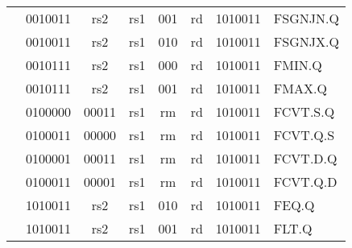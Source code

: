 \begin{table}[p]
\begin{small}
\begin{center}
\begin{tabular}{p{0in}p{0.4in}p{0.05in}p{0.05in}p{0.05in}p{0.05in}p{0.4in}p{0.6in}p{0.4in}p{0.6in}p{0.7in}l}
&
\multicolumn{4}{|c|}{0010011} &
\multicolumn{2}{c|}{rs2} &
\multicolumn{1}{c|}{rs1} &
\multicolumn{1}{c|}{001} &
\multicolumn{1}{c|}{rd} &
\multicolumn{1}{c|}{1010011} & FSGNJN.Q \\
\cline{2-11}
  

&
\multicolumn{4}{|c|}{0010011} &
\multicolumn{2}{c|}{rs2} &
\multicolumn{1}{c|}{rs1} &
\multicolumn{1}{c|}{010} &
\multicolumn{1}{c|}{rd} &
\multicolumn{1}{c|}{1010011} & FSGNJX.Q \\
\cline{2-11}
  

&
\multicolumn{4}{|c|}{0010111} &
\multicolumn{2}{c|}{rs2} &
\multicolumn{1}{c|}{rs1} &
\multicolumn{1}{c|}{000} &
\multicolumn{1}{c|}{rd} &
\multicolumn{1}{c|}{1010011} & FMIN.Q \\
\cline{2-11}
  

&
\multicolumn{4}{|c|}{0010111} &
\multicolumn{2}{c|}{rs2} &
\multicolumn{1}{c|}{rs1} &
\multicolumn{1}{c|}{001} &
\multicolumn{1}{c|}{rd} &
\multicolumn{1}{c|}{1010011} & FMAX.Q \\
\cline{2-11}
  

&
\multicolumn{4}{|c|}{0100000} &
\multicolumn{2}{c|}{00011} &
\multicolumn{1}{c|}{rs1} &
\multicolumn{1}{c|}{rm} &
\multicolumn{1}{c|}{rd} &
\multicolumn{1}{c|}{1010011} & FCVT.S.Q \\
\cline{2-11}
  

&
\multicolumn{4}{|c|}{0100011} &
\multicolumn{2}{c|}{00000} &
\multicolumn{1}{c|}{rs1} &
\multicolumn{1}{c|}{rm} &
\multicolumn{1}{c|}{rd} &
\multicolumn{1}{c|}{1010011} & FCVT.Q.S \\
\cline{2-11}
  

&
\multicolumn{4}{|c|}{0100001} &
\multicolumn{2}{c|}{00011} &
\multicolumn{1}{c|}{rs1} &
\multicolumn{1}{c|}{rm} &
\multicolumn{1}{c|}{rd} &
\multicolumn{1}{c|}{1010011} & FCVT.D.Q \\
\cline{2-11}
  

&
\multicolumn{4}{|c|}{0100011} &
\multicolumn{2}{c|}{00001} &
\multicolumn{1}{c|}{rs1} &
\multicolumn{1}{c|}{rm} &
\multicolumn{1}{c|}{rd} &
\multicolumn{1}{c|}{1010011} & FCVT.Q.D \\
\cline{2-11}
  

&
\multicolumn{4}{|c|}{1010011} &
\multicolumn{2}{c|}{rs2} &
\multicolumn{1}{c|}{rs1} &
\multicolumn{1}{c|}{010} &
\multicolumn{1}{c|}{rd} &
\multicolumn{1}{c|}{1010011} & FEQ.Q \\
\cline{2-11}
  

&
\multicolumn{4}{|c|}{1010011} &
\multicolumn{2}{c|}{rs2} &
\multicolumn{1}{c|}{rs1} &
\multicolumn{1}{c|}{001} &
\multicolumn{1}{c|}{rd} &
\multicolumn{1}{c|}{1010011} & FLT.Q \\
\cline{2-11}
  


\end{tabular}
\end{center}
\end{small}
\end{table}
